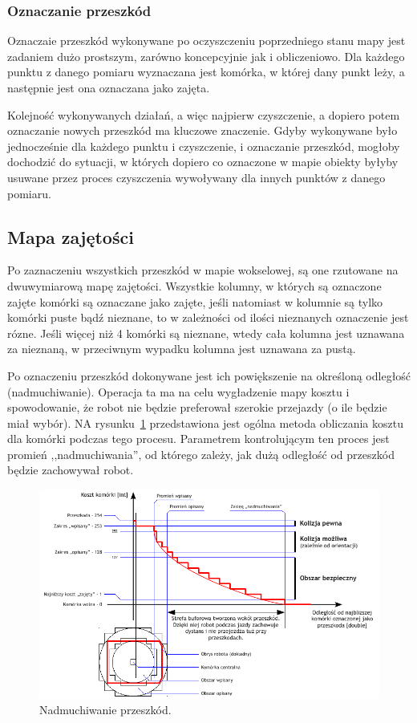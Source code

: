 \subsubsection{Oznaczanie przeszkód}

Oznaczaie przeszkód wykonywane po oczyszczeniu poprzedniego stanu mapy jest zadaniem
dużo prostszym, zarówno koncepcyjnie jak i obliczeniowo. Dla każdego punktu z danego
pomiaru wyznaczana jest komórka, w której dany punkt leży, a następnie jest ona
oznaczana jako zajęta.

Kolejność wykonywanych działań, a więc najpierw czyszczenie, a dopiero potem
oznaczanie nowych przeszkód ma kluczowe znaczenie. Gdyby wykonywane było jednocześnie
dla każdego punktu i czyszczenie, i oznaczanie przeszkód, mogłoby dochodzić do
sytuacji, w których dopiero co oznaczone w mapie obiekty byłyby usuwane przez proces
czyszczenia wywoływany dla innych punktów z danego pomiaru.


\subsection{Mapa zajętości}

Po zaznaczeniu wszystkich przeszkód w mapie wokselowej, są one rzutowane na
dwuwymiarową mapę zajętości. Wszystkie kolumny, w których są oznaczone zajęte
komórki są oznaczane jako zajęte, jeśli natomiast w kolumnie są tylko komórki
puste bądź nieznane, to w zależności od ilości nieznanych oznaczenie jest rózne.
Jeśli więcej niż 4 komórki są nieznane, wtedy cała kolumna jest uznawana za
nieznaną, w przeciwnym wypadku kolumna jest uznawana za pustą.

Po oznaczeniu przeszkód dokonywane jest ich powiększenie na określoną odległość
(nadmuchiwanie). Operacja ta ma na celu wygładzenie mapy kosztu i spowodowanie,
że robot nie będzie preferował szerokie przejazdy (o ile będzie miał wybór). NA
rysunku~\ref{fig:inflation} przedstawiona jest ogólna metoda obliczania kosztu
dla komórki podczas tego procesu. Parametrem kontrolującym ten proces jest
promień ,,nadmuchiwania'', od którego zależy, jak dużą odległość od
przeszkód będzie zachowywał robot.

\begin{figure}[htb!]
\centering
\includegraphics[width=15cm]{../../Common/img/ros/inflate.pdf}
\caption{Nadmuchiwanie przeszkód.}
\label{fig:inflation}
\end{figure}

